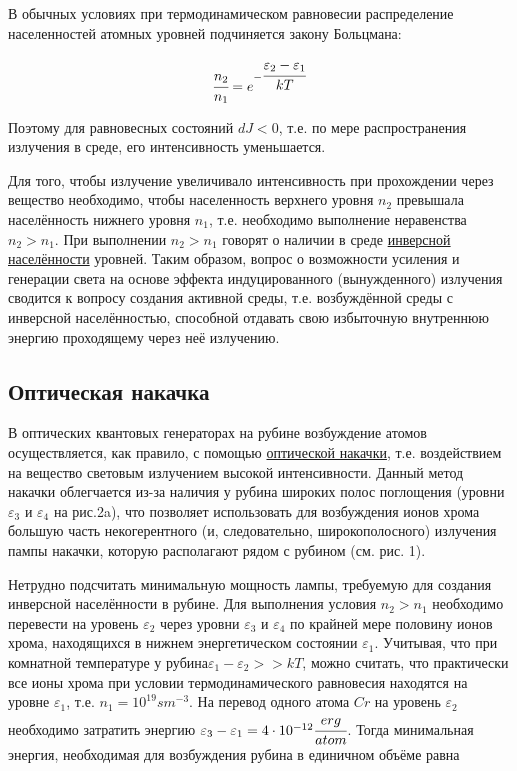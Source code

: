 \documentclass[a4paper,14pt,russian]{article}
\begin{document}
В обычных условиях при термодинамическом равновесии распределение населенностей атомных уровней подчиняется закону Больцмана:

\begin{eqnarray}
\cfrac {n_2} {n_1} = e^{- \cfrac {\varepsilon_2 - \varepsilon_1} {kT}}
\end{eqnarray}

Поэтому для равновесных состояний $dJ < 0$, т.е. по мере распространения излучения в среде, его интенсивность уменьшается.

Для того, чтобы излучение увеличивало интенсивность при прохождении через вещество необходимо, чтобы населенность верхнего уровня $n_2$ превышала населённость нижнего уровня $n_1$, т.е. необходимо выполнение неравенства $n_2 > n_1$. При выполнении $n_2 > n_1$ говорят о наличии в среде \underline{инверсной населённости} уровней. Таким образом, вопрос о возможности усиления и генерации света на основе эффекта индуцированного (вынужденного) излучения сводится к вопросу создания активной среды, т.е. возбуждённой среды с инверсной населённостью, способной отдавать свою избыточную внутреннюю энергию проходящему через неё излучению.

\subsection {Оптическая накачка}

В оптических квантовых генераторах на рубине возбуждение атомов осуществляется, как правило, с помощью \underline{оптической накачки}, т.е. воздействием на вещество световым излучением высокой интенсивности. Данный метод накачки облегчается из-за наличия у рубина широких полос поглощения (уровни $\varepsilon_3$ и $\varepsilon_4$ на рис.2a), что позволяет использовать для возбуждения ионов хрома большую часть некогерентного (и, следовательно, широкополосного) излучения пампы накачки, которую располагают рядом с рубином (см. рис. 1).

Нетрудно подсчитать минимальную мощность лампы, требуемую для создания инверсной населённости в рубине. Для выполнения условия $n_2 > n_1$ необходимо перевести на уровень $\varepsilon_2$ через уровни $\varepsilon_3$ и $\varepsilon_4$ по крайней мере половину ионов хрома, находящихся в нижнем энергетическом состоянии $\varepsilon_1$. Учитывая, что при комнатной температуре у рубина$\varepsilon_1 - \varepsilon_2 >> kT$, можно считать, что практически все ионы хрома при условии термодинамического равновесия находятся на уровне $\varepsilon_1$, т.е. $n_1 = 10^19 sm^{-3}$. На перевод одного атома $Cr$ на уровень $\varepsilon_2$ необходимо затратить энергию $\varepsilon_3 - \varepsilon_1 = 4 \cdot 10^{-12} \cfrac {erg} {atom}$. Тогда минимальная энергия, необходимая для возбуждения рубина в единичном объёме равна
\end{document}
